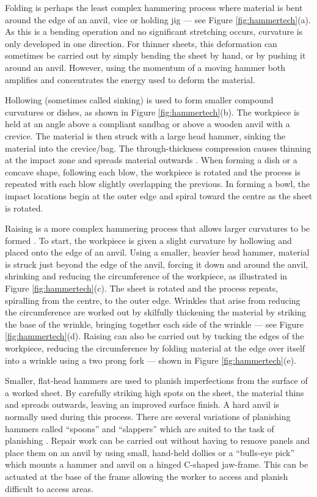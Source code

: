 Folding is perhaps the least complex hammering process where material is bent around the edge of an anvil, vice or holding jig --- see Figure \ref{fig:hammertech}(a). As this is a bending operation and no significant stretching occurs, curvature is only developed in one direction. For thinner sheets, this deformation can sometimes be carried out by simply bending the sheet by hand, or by pushing it around an anvil. However, using the momentum of a moving hammer both amplifies and concentrates the energy used to deform the material. 

Hollowing (sometimes called sinking) is used to form smaller compound curvatures or dishes, as shown in Figure \ref{fig:hammertech}(b). The workpiece is held at an angle above a compliant sandbag or above a wooden anvil with a crevice. The material is then struck with a large head hammer, sinking the material into the crevice/bag. The through-thickness compression causes thinning at the impact zone and spreads material outwards \citep{Music2012TheTools}. When forming a dish or a concave shape, following each blow, the workpiece is rotated and the process is repeated with each blow slightly overlapping the previous. In forming a bowl, the impact locations begin at the outer edge and spiral toward the centre as the sheet is rotated.

Raising is a more complex hammering process that allows larger curvatures to be formed \citep{Livesey2019TheBodies}. To start, the workpiece is given a slight curvature by hollowing and placed onto the edge of an anvil. Using a smaller, heavier head hammer, material is struck just beyond the edge of the anvil, forcing it down and around the anvil, shrinking and reducing the circumference of the workpiece, as illustrated in Figure \ref{fig:hammertech}(c). The sheet is rotated and the process repeats, spiralling from the centre, to the outer edge. Wrinkles that arise from reducing the circumference are worked out by skilfully thickening the material by striking the base of the wrinkle, bringing together each side of the wrinkle --- see Figure \ref{fig:hammertech}(d).  Raising can also be carried out by tucking the edges of the workpiece, reducing the circumference by folding material at the edge over itself into a wrinkle using a two prong fork --- shown in Figure \ref{fig:hammertech}(e). 

Smaller, flat-head hammers are used to planish imperfections from the surface of a worked sheet. By carefully striking high spots on the sheet, the material thins and spreads outwards, leaving an improved surface finish. A hard anvil is normally used during this process. There are several variations of planishing hammers called ``spoons'' and ``slappers'' which are suited to the task of planishing \citep{Barr2013ProfessionalFabrication}. 
Repair work can be carried out without having to remove panels and place them on an anvil by using small, hand-held dollies or a ``bulls-eye pick'' which mounts a hammer and anvil on a hinged C-shaped jaw-frame. This can be actuated at the base of the frame allowing the worker to access and planish difficult to access areas.


